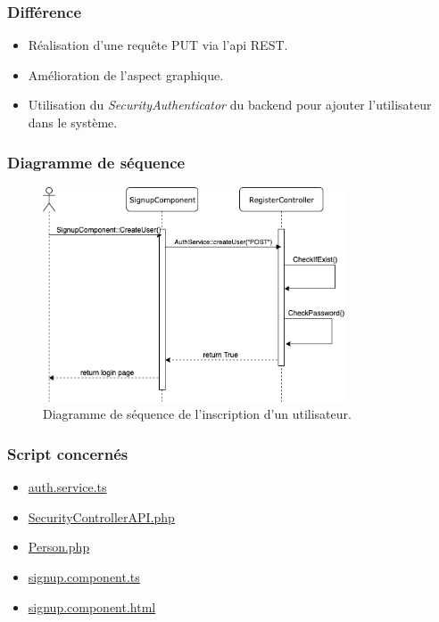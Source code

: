\subsubsection{Différence}
	\begin{itemize}
		\item Réalisation d'une requête PUT via l'api REST.
		\item Amélioration de l'aspect graphique. 
		\item Utilisation du \textit{SecurityAuthenticator} du backend pour ajouter l'utilisateur dans le système.
	\end{itemize}


\subsubsection{Diagramme de séquence}
	\begin{figure}[h]
		\includegraphics[width=0.8\textwidth,center]{Diagramme/sequence-us1-angular}
		\caption{Diagramme de séquence de l'inscription d'un utilisateur. }
	\end{figure}
	
\vspace{\baselineskip}
\subsubsection{Script concernés}
	\begin{itemize}
		\item \href{https://github.com/victorsmits/Aquabike/blob/master/frontend/src/app/service/auth.service.ts}{auth.service.ts}
		\item \href{https://github.com/victorsmits/Aquabike/blob/master/backend/src/Controller/API/SecurityControllerAPI.php}{SecurityControllerAPI.php}
		\item \href{https://github.com/victorsmits/Aquabike/blob/master/backend/src/Entity/Person.php}{Person.php}
		\item \href{https://github.com/victorsmits/Aquabike/blob/master/frontend/src/app/signup/signup.component.ts}{signup.component.ts}
		\item \href{https://github.com/victorsmits/Aquabike/blob/master/frontend/src/app/signup/signup.component.html}{signup.component.html}
	\end{itemize}
